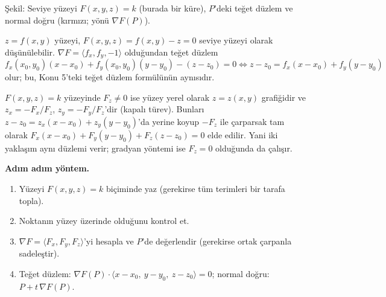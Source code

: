 \begin{center}
\end{center}
{\small Şekil: Seviye yüzeyi $F(x,y,z)=k$ (burada bir küre), $P$'deki teğet düzlem ve normal doğru (kırmızı; yönü $\nabla F(P)$).}

\begin{teorem}[Özel durum: $z=f(x,y)$ grafiği]
$z=f(x,y)$ yüzeyi, $F(x,y,z)=f(x,y)-z=0$ seviye yüzeyi olarak düşünülebilir. $\nabla F=\langle f_x,f_y,-1\rangle$
olduğundan teğet düzlem
\[
f_x(x_0,y_0)(x-x_0)+f_y(x_0,y_0)(y-y_0)-(z-z_0)=0\iff z-z_0=f_x(x-x_0)+f_y(y-y_0)
\]
olur; bu, Konu 5'teki teğet düzlem formülünün aynısıdır.
\end{teorem}

\begin{bilgi}
$F(x,y,z)=k$ yüzeyinde $F_z\ne0$ ise yüzey yerel olarak $z=z(x,y)$ grafiğidir ve $z_x=-F_x/F_z$, $z_y=-F_y/F_z$'dir
(kapalı türev). Bunları $z-z_0=z_x(x-x_0)+z_y(y-y_0)$'da yerine koyup $-F_z$ ile çarparsak tam olarak
$F_x(x-x_0)+F_y(y-y_0)+F_z(z-z_0)=0$ elde edilir. Yani iki yaklaşım aynı düzlemi verir; gradyan yöntemi ise
$F_z=0$ olduğunda da çalışır.
\end{bilgi}

\textbf{Adım adım yöntem.}
\begin{enumerate}
  \item Yüzeyi $F(x,y,z)=k$ biçiminde yaz (gerekirse tüm terimleri bir tarafa topla).
  \item Noktanın yüzey üzerinde olduğunu kontrol et.
  \item $\nabla F=\langle F_x,F_y,F_z\rangle$'yi hesapla ve $P$'de değerlendir (gerekirse ortak çarpanla sadeleştir).
  \item Teğet düzlem: $\nabla F(P)\cdot\langle x-x_0,\ y-y_0,\ z-z_0\rangle=0$; normal doğru: $P+t\,\nabla F(P)$.
\end{enumerate}

